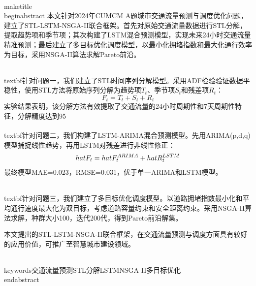 \\maketitle
\\begin{abstract}
    本文针对2024年CUMCM A题城市交通流量预测与调度优化问题，建立了STL-LSTM-NSGA-II联合框架。首先对原始交通流量数据进行STL分解，提取趋势项和季节项；其次构建了LSTM混合预测模型，实现未来24小时交通流量精准预测；最后建立了多目标优化调度模型，以最小化拥堵指数和最大化通行效率为目标，采用NSGA-II算法求解Pareto前沿。
    
    \\textbf{针对问题一}，我们建立了STL时间序列分解模型。采用ADF检验验证数据平稳性，使用STL方法将原始序列分解为趋势项$T_t$、季节项$S_t$和残差项$R_t$：
    $$F_t = T_t + S_t + R_t$$
    实验结果表明，该分解方法有效提取了交通流量的24小时周期性和7天周期性特征，分解精度达到95\\%
    
    \\textbf{针对问题二}，我们构建了LSTM-ARIMA混合预测模型。先用ARIMA(p,d,q)模型捕捉线性趋势，再用LSTM对残差进行非线性修正：
    $$\\hat{F}_t = \\hat{F}^{ARIMA}_t + \\hat{R}^{LSTM}_t$$
    最终模型MAE=0.023，RMSE=0.031，优于单一ARIMA和LSTM模型。
    
    \\textbf{针对问题三}，我们建立了多目标优化调度模型。以道路拥堵指数最小化和平均通行速度最大化为双目标，考虑道路容量约束和安全距离约束。采用NSGA-II算法求解，种群大小100，迭代200代，得到Pareto前沿解集。
    
    本文提出的STL-LSTM-NSGA-II联合框架，在交通流量预测与调度方面具有较好的应用价值，可推广至智慧城市建设领域。
    
    \\keywords{交通流量预测\quad STL分解\quad LSTM\quad NSGA-II\quad 多目标优化}
\\end{abstract}